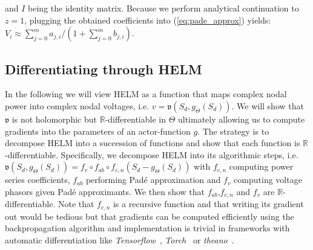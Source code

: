  and $I$ being the identity matrix. Because we perform analytical continuation to $z=1$, plugging the obtained coefficients into (\ref{eq:pade_approx}) yields: $V_i \approx \sum_{j=0}^m a_{j,i} / (1+\sum_{j=0}^m b_{j,i})$.

\subsection{Differentiating through HELM}
In the following we will view HELM as a function that maps complex nodal power into complex nodal voltages, i.e. $v = \mathfrak{v}(S_d,g_\Theta(S_d))$. We will show that $\mathfrak{v}$ is not holomorphic but $\mathbb{R}$-differentiable in $\Theta$ ultimately allowing us to compute gradients into the parameters of an actor-function $g$. The strategy is to decompose HELM into a succession of functions and show that each function is $\mathbb{R}$-differentiable. Specifically, we decompose HELM into its algorithmic steps, i.e. $\mathfrak{v}(S_d,g_\Theta(S_d)) = f_v \circ f_{ab} \circ f_{c,n} (S_d-g_\Theta(S_d))$ with $f_{c,n}$ computing power series coefficients, $f_{ab}$ performing Pad\'e approximation and $f_v$ computing voltage phasors given Pad\'e approximants. We then show that $f_{ab}$,$f_{c,n}$ and $f_{v}$ are $\mathbb{R}$-differentiable. Note that $f_{c,n}$ is a recursive function and that writing its gradient out would be tedious but that gradients can be computed efficiently using the backpropagation algorithm and implementation is trivial in frameworks with automatic differentiation like \emph{Tensorflow}~\cite{tensorflow2015-whitepaper}, \emph{Torch}~\cite{paszke2017automatic} or \emph{theano}~\cite{2016arXiv160502688short}.

